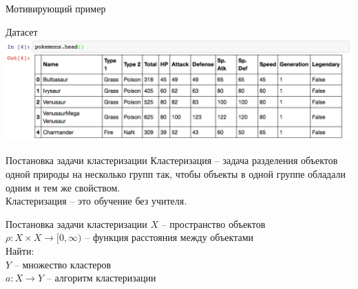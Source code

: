 \documentclass[10pt]{beamer}
\begin{document}
{\begin{frame}{Мотивирующий пример}
\begin{figure}
	    \qquad 
	    \qquad
	    \qquad
	\end{figure}
\end{frame}
}

\begin{frame}{Датасет}
    \centering
	\includegraphics[width=\textwidth]{../lecture2/images/pokemons}
\end{frame}

\begin{frame}{Постановка задачи кластеризации}
  Кластеризация -- задача разделения объектов одной природы на несколько групп так, чтобы объекты в одной группе обладали одним и тем же свойством.\\
  \bigbreak
  \pause
  Кластеризация -- это обучение без учителя.

\end{frame}

\begin{frame}{Постановка задачи кластеризации}
	$X$ -- пространство объектов\\
	$\rho: X \times X \rightarrow [0, \infty)$ -- функция расстояния между объектами\\
	\bigbreak
	\alert{Найти}:\\
	$Y$ -- множество кластеров \\
	$a: X \rightarrow Y$ -- алгоритм кластеризации
\end{frame}
\end{document}
